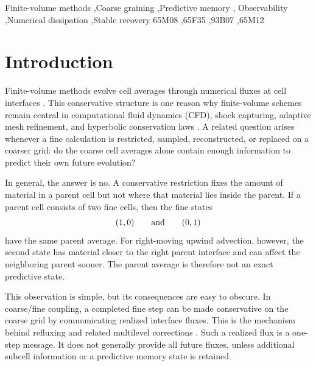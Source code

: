 \documentclass[preprint,12pt]{elsarticle}
\theoremstyle{plain}
\theoremstyle{remark}
\theoremstyle{definition}
\begin{document}
\begin{frontmatter}
\begin{keyword}
Finite-volume methods \sep Coarse graining \sep Predictive memory \sep
Observability \sep Numerical dissipation \sep Stable recovery
\MSC[2020] 65M08 \sep 65F35 \sep 93B07 \sep 65M12
\end{keyword}

\end{frontmatter}

\color{black}
\section{Introduction} \label{intro}

Finite-volume methods evolve cell averages through numerical fluxes at cell
interfaces \cite{LeVeque:2002fvm,EymardGallouetHerbin:2000fvm,
MoukalledManganiDarwish:2016fvm}.  This conservative structure is one reason
why finite-volume schemes remain central in computational fluid dynamics (CFD),
shock capturing, adaptive mesh refinement, and hyperbolic conservation laws
\cite{CrandallMajda:1980monotone,Berger:1987interfaces,
BergerColella:1989amr,KurganovTadmor:2000central,
GottliebShuTadmor:2001ssp}.  A related question arises whenever a fine
calculation is restricted, sampled, reconstructed, or replaced on a coarser
grid: do the coarse cell averages alone contain enough information to
predict their own future evolution?

In general, the answer is no.  A conservative restriction fixes the amount
of material in a parent cell but not where that material lies inside the
parent.  If a parent cell consists of two fine cells, then the fine states
\[
  (1,0)
  \qquad\hbox{and}\qquad
  (0,1)
\]
have the same parent average.  For right-moving upwind advection, however,
the second state has material closer to the right parent interface and can
affect the neighboring parent sooner.  The parent average is therefore not an
exact predictive state.

This observation is simple, but its consequences are easy to obscure.  In
coarse/fine coupling, a completed fine step can be made conservative on the
coarse grid by communicating realized interface fluxes.  This is the
mechanism behind refluxing and related multilevel corrections
\cite{OsherSanders:1983localtime,ConstantinescuSandu:2007multirate,Thornber:2008entropy}.  Such a
realized flux is a one-step message.  It does not generally provide all
future fluxes, unless additional subcell information or a predictive memory
state is retained.
\end{document}
